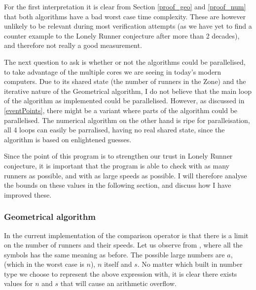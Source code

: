 For the first interpretation it is clear from Section \ref{proof_geo} and \ref{proof_num} that both algorithms have a bad worst case time complexity. These are however unlikely to be relevant during most verification attempts (as we have yet to find a counter example to the Lonely Runner conjecture after more than 2 decades), and therefore not really a good measurement. 

The next question to ask is whether or not the algorithms could be parallelised, to take advantage of the multiple cores we are seeing in today's modern computers. Due to its shared state (the number of runners in the Zone) and the iterative nature of the Geometrical algorithm, I do not believe that the main loop of the algorithm as implemented could be parallelised. However, as discussed in \ref{eventPoints}, there might be a variant where parts of the algorithm could be parallelised. The numerical algorithm on the other hand is ripe for paralleisation, all 4 loops can easily be parralised, having no real shared state, since the algorithm is based on enlightened guesses.

Since the point of this program is to strengthen our trust in Lonely Runner conjecture, it is important that the program is able to check with as many runners as possible, and with as large speeds as possible. I will therefore analyse the bounds on these values in the following section, and discuss how I have improved these.

\subsubsection{Geometrical algorithm}
In the current implementation of the comparison operator is that there is a limit on the number of runners and their speeds. Let us observe  
 from , where all the symbols has the same meaning as before. The possible large numbers are $a$, (which in the worst case is $n$), $n$ itself and $s$. No matter which built in number type we choose to represent the above expression with, it is clear there exists values for $n$ and $s$ that will cause an arithmetic overflow.


